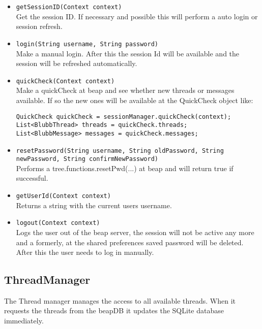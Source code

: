 \documentclass[12pt,a4paper,oneside]{report}
\newcommand{\code}[1]{\lstinline{#1}}
\begin{document}
\begin{itemize}
\item{\code{getSessionID(Context context)}}\\
Get the session ID. If necessary and possible this will perform a auto login or session refresh.

\item{\code{login(String username, String password)}}\\
Make a manual login. After this the session Id will be available and the session will be refreshed automatically.

\item{\code{quickCheck(Context context)}}\\
Make a quickCheck at beap and see whether new threads or messages available. If so the new ones will be available at the QuickCheck object like: \begin{lstlisting}
QuickCheck quickCheck = sessionManager.quickCheck(context);
List<BlubbThread> threads = quickCheck.threads;
List<BlubbMessage> messages = quickCheck.messages;
\end{lstlisting}

\item{\code{resetPassword(String username, String oldPassword, String newPassword, String confirmNewPassword)}}\\
Performs a tree.functions.resetPwd(...) at beap and will return true if successful.

\item{\code{getUserId(Context context)}}\\
Returns a string with the current users username.

\item{\code{logout(Context context)}}\\
Logs the user out of the beap server, the session will not be active any more and a formerly, at the shared preferences saved password will be deleted. After this the user needs to log in manually.


\end{itemize}

\subsection{ThreadManager}
The Thread manager manages the access to all available threads. When it requests the threads from the beapDB it updates the SQLite database immediately. 
\end{document}
